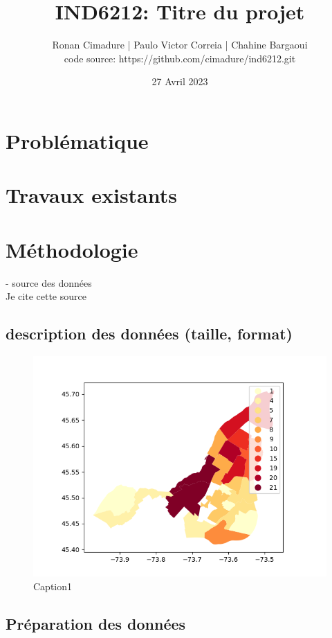\documentclass[12pt]{article}
\title{IND6212: Titre du projet}
\author{Ronan Cimadure | Paulo Victor Correia | Chahine Bargaoui  \\ code source: https://github.com/cimadure/ind6212.git}
\date{27 Avril 2023}
\begin{document}
\maketitle

\section{Problématique}
\blindtext[3]
\section{Travaux existants}
\blindtext[1]
\section{Méthodologie}
- source des données \\
Je cite cette source \cite{example-article}\\
\subsection{description des données (taille, format)}


\begin{figure}
    \includegraphics[width=1\linewidth]{media/nombre_de_secteurs_par_arrondissement.png} 
    \caption{Caption1}
    \label{fig:nspa}
\end{figure}

\subsection{Préparation des données}
\end{document}

